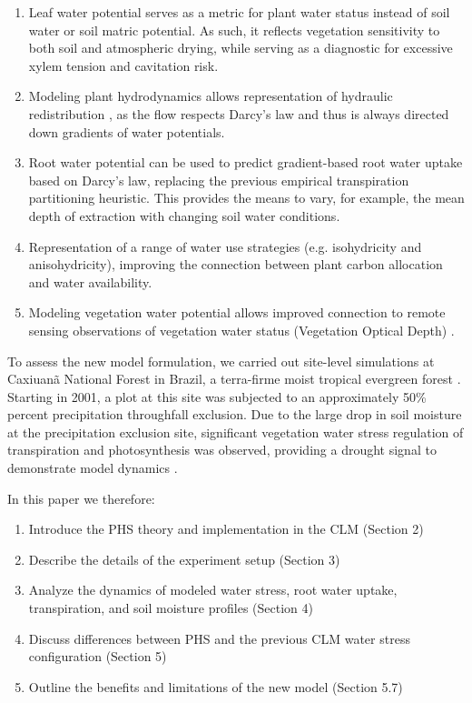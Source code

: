\documentclass[draft,linenumbers]{agujournal}
\begin{document}
\begin{enumerate}
\item Leaf water potential serves as a metric for plant water status instead of soil water or soil matric potential. As such, it reflects vegetation sensitivity to both soil and atmospheric drying, while serving as a diagnostic for excessive xylem tension and cavitation risk. 
\item Modeling plant hydrodynamics allows representation of hydraulic redistribution \citep{lee2005}, as the flow respects Darcy's law and thus is always directed down gradients of water potentials. 
\item Root water potential can be used to predict gradient-based root water uptake based on Darcy's law, replacing the previous empirical transpiration partitioning heuristic. This provides the means to vary, for example, the mean depth of extraction with changing soil water conditions.
\item Representation of a range of water use strategies (e.g. isohydricity and anisohydricity), improving the connection between plant carbon allocation and water availability.
\item Modeling vegetation water potential allows improved connection to remote sensing observations of vegetation water status (Vegetation Optical Depth) \citep{konings2016}. 
\end{enumerate}

To assess the new model formulation, we carried out site-level simulations at Caxiuan\~a National Forest in Brazil, a terra-firme moist tropical evergreen forest \citep{fisher2006}. Starting in 2001, a plot at this site was subjected to an approximately 50\% percent precipitation throughfall exclusion. Due to the large drop in soil moisture at the precipitation exclusion site, significant vegetation water stress regulation of transpiration and photosynthesis was observed\citep{dacosta2010,dacosta2013}, providing a drought signal to demonstrate model dynamics \citep{fisher2007}.

In this paper we therefore:
\begin{enumerate}
\item Introduce the PHS theory and implementation in the CLM (Section 2)
\item Describe the details of the experiment setup (Section 3)
\item Analyze the dynamics of modeled water stress, root water uptake, transpiration, and soil moisture profiles (Section 4)
\item Discuss differences between PHS and the previous CLM water stress configuration (Section 5)
\item Outline the benefits and limitations of the new model (Section 5.7)
\end{enumerate}
\end{document}
